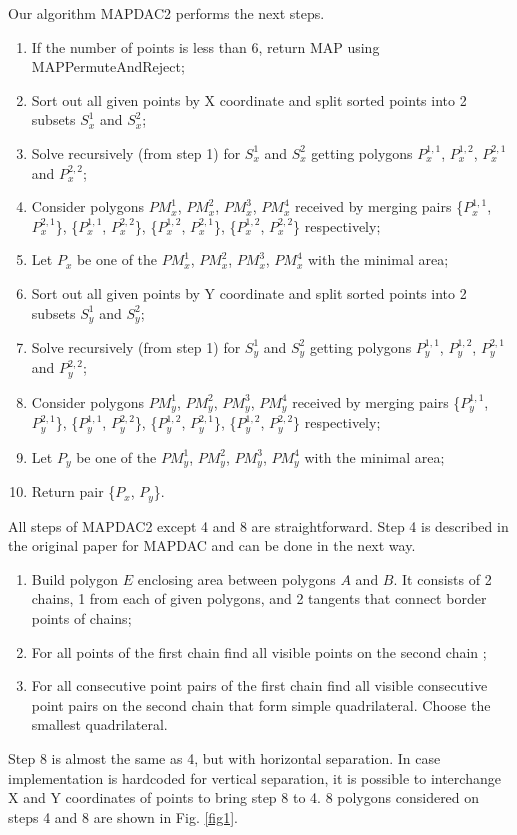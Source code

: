 \documentclass[conference]{IEEEtran}
\begin{document}
			Our algorithm MAP{\textunderscore}DAC2 performs the next steps.
			\begin{enumerate}
				\item If the number of points is less than 6, return MAP using MAP{\textunderscore}PermuteAndReject;
				\item Sort out all given points by X coordinate and split sorted points into 2 subsets $S_{x}^{1}$ and $S_{x}^{2}$;
				\item Solve recursively (from step 1) for $S_{x}^{1}$ and $S_{x}^{2}$ getting polygons $P_{x}^{1,1}$, $P_{x}^{1,2}$, $P_{x}^{2,1}$ and $P_{x}^{2,2}$;
				\item Consider polygons $PM_{x}^{1}$, $PM_{x}^{2}$, $PM_{x}^{3}$, $PM_{x}^{4}$ received by merging pairs 
				\{$P_{x}^{1,1}$, $P_{x}^{2,1}$\}, 
				\{$P_{x}^{1,1}$, $P_{x}^{2,2}$\}, 
				\{$P_{x}^{1,2}$, $P_{x}^{2,1}$\}, 
				\{$P_{x}^{1,2}$, $P_{x}^{2,2}$\} respectively;
				\item  Let $P_{x}$ be one of the $PM_{x}^{1}$, $PM_{x}^{2}$, $PM_{x}^{3}$, $PM_{x}^{4}$ with the minimal area;
				\item Sort out all given points by Y coordinate and split sorted points into 2 subsets $S_{y}^{1}$ and $S_{y}^{2}$;
				\item Solve recursively (from step 1) for $S_{y}^{1}$ and $S_{y}^{2}$ getting polygons $P_{y}^{1,1}$, $P_{y}^{1,2}$, $P_{y}^{2,1}$ and $P_{y}^{2,2}$;
				\item Consider polygons $PM_{y}^{1}$, $PM_{y}^{2}$, $PM_{y}^{3}$, $PM_{y}^{4}$ received by merging pairs 
				\{$P_{y}^{1,1}$, $P_{y}^{2,1}$\}, 
				\{$P_{y}^{1,1}$, $P_{y}^{2,2}$\}, 
				\{$P_{y}^{1,2}$, $P_{y}^{2,1}$\}, 
				\{$P_{y}^{1,2}$, $P_{y}^{2,2}$\} respectively;
				\item Let $P_{y}$ be one of the $PM_{y}^{1}$, $PM_{y}^{2}$, $PM_{y}^{3}$, $PM_{y}^{4}$ with the minimal area;
				\item Return pair \{$P_{x}$, $P_{y}$\}.
			\end {enumerate}
			
			All steps of MAP{\textunderscore}DAC2 except 4 and 8 are straightforward.
			Step 4 is described in the original paper for MAP{\textunderscore}DAC \cite{link13} and can be done in the next way.
			\begin{enumerate}
				\item Build polygon $E$ enclosing area between polygons $A$ and $B$.
				It consists of 2 chains, 1 from each of given polygons, and 2 tangents that connect border points of chains;
				\item For all points of the first chain find all visible points on the second chain \cite{link14};
				\item For all consecutive point pairs of the first chain find all visible consecutive point pairs on the second chain that form simple quadrilateral.
				Choose the smallest quadrilateral. 
			\end {enumerate}
			Step 8 is almost the same as 4, but with horizontal separation.
			In case implementation is hardcoded for vertical separation, it is possible to interchange X and Y coordinates of points to bring step 8 to 4.
			8 polygons considered on steps 4 and 8 are shown in Fig. \ref{fig1}.
			
\end{document}
